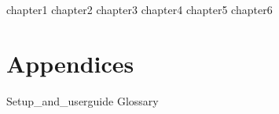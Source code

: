 \documentclass[12pt,a4paper]{report}
\begin{document}
\tableofcontents

{chapter1}
{chapter2}
{chapter3}
{chapter4}
{chapter5}
{chapter6}


\appendix
\chapter{Appendices}
{Setup_and_userguide}
{Glossary}
\end{document}
